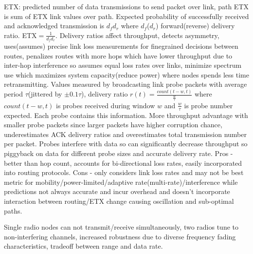 \documentclass[9pt]{extarticle}
\begin{document}
\begin{multicols}{2}
ETX: predicted number of data transmissions to send packet over link, path ETX is sum of ETX link values over path. Expected probability of successfully received and acknowledged transmission is $d_fd_r$ where $d_f$($d_r$) forward(reverse) delivery ratio. ETX$=\frac{1}{d_fd_r}$. Delivery ratios affect throughput, detects asymmetry, uses(assumes) precise link loss measurements for finegrained decisions between routes, penalizes routes with more hops which have lower throughput due to inter-hop interference so assumes equal loss rates over links, minimize spectrum use which maximizes system capacity(reduce power) where nodes spends less time retransmitting. Values measured by broadcasting link probe packets with average period $\tau$(jittered by $±0.1\tau$), delivery ratio $r(t)=\frac{count(t-w,t)}{\frac{w}{\tau}}$ where $count(t-w,t)$ is probes received during window $w$ and $\frac{w}{\tau}$ is probe number expected. Each probe contains this information. More throughput advantage with smaller probe packets since larger packets have higher corruption chance, underestimates ACK delivery ratios and overestimates total transmission number per packet. Probes interfere with data so can significantly decrease throughput so piggyback on data for different probe sizes and accurate delivery rate. Pros - better than hop count, accounts for bi-directional loss rates, easily incorporated into routing protocols. Cons - only considers link loss rates and may not be best metric for mobility/power-limited/adaptive rate(multi-rate)/interference while predictions not always accurate and incur overhead and doesn't incorporate interaction between routing/ETX change causing oscillation and sub-optimal paths. 

Single radio nodes can not transmit/receive simultaneously, two radios tune to non-interfering channels, increased robustness due to diverse frequency fading characteristics, tradeoff between range and
data rate.


\end{multicols}
\end{document}
